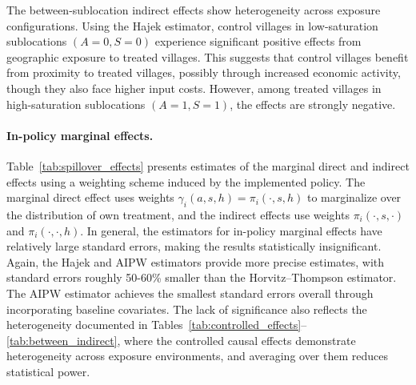 \documentclass{article}
\newcommand{\pscore}[1]{\pi_{#1}}
\begin{document}
The between-sublocation indirect effects show heterogeneity across exposure configurations. Using the Hajek estimator, control villages in low-saturation sublocations $(A=0, S=0)$ experience significant positive effects from geographic exposure to treated villages. This suggests that control villages benefit from proximity to treated villages, possibly through increased economic activity, though they also face higher input costs. However, among treated villages in high-saturation sublocations $(A=1, S=1)$, the effects are strongly negative. 

\paragraph{In-policy marginal effects.} Table~\ref{tab:spillover_effects} presents estimates of the marginal direct and indirect effects using a weighting scheme induced by the implemented policy. The marginal direct effect uses weights $\gamma_i(a,s,h) = \pscore{i}(\cdot,s,h)$ to marginalize over the distribution of own treatment, and the indirect effects use weights $\pscore{i}(\cdot,s,\cdot)$ and $\pscore{i}(\cdot,\cdot,h)$. In general, the estimators for in-policy marginal effects have relatively large standard errors, making the results statistically insignificant. Again, the Hajek and AIPW estimators provide more precise estimates, with standard errors roughly 50-60\% smaller than the Horvitz--Thompson estimator. The AIPW estimator achieves the smallest standard errors overall through incorporating baseline covariates. The lack of significance also reflects the heterogeneity documented in Tables~\ref{tab:controlled_effects}--\ref{tab:between_indirect}, where the controlled causal effects demonstrate heterogeneity across exposure environments, and averaging over them reduces statistical power.
\end{document}
